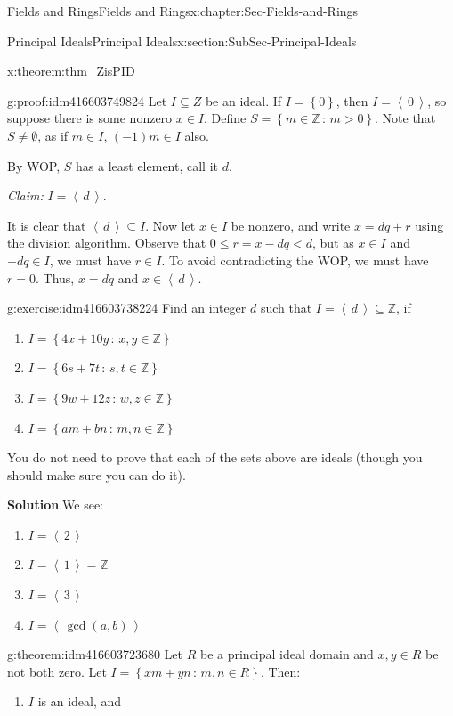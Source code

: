 \documentclass[oneside,10pt,]{book}
\numberwithin{equation}{section}
\renewcommand{\le}{\leqslant}
\newcommand{\ideal}[1]{\left\langle\, #1 \,\right\rangle}
\newcommand{\set}[1]{\left\{ {#1} \right\}}
\newcommand{\setof}[2]{{\left\{#1\,\colon\,#2\right\}}}
\def\Z{{\mathbb Z}}
\newcommand{\lt}{<}
\begin{document}
\begin{chapterptx}{Fields and Rings}{}{Fields and Rings}{}{}{x:chapter:Sec-Fields-and-Rings}
\begin{sectionptx}{Principal Ideals}{}{Principal Ideals}{}{}{x:section:SubSec-Principal-Ideals}
\begin{theorem}{}{}{x:theorem:thm_ZisPID}
\end{theorem}
\begin{proofptx}{}{g:proof:idm416603749824}
Let \(I\subseteq Z\) be an ideal. If \(I = \set{0}\), then \(I = \ideal{0}\), so suppose there is some nonzero \(x\in I\). Define \(S = \setof{m\in \Z}{m > 0}\). Note that \(S\ne \emptyset\), as if \(m\in I\), \((-1)m \in I\) also.%
\par
By WOP, \(S\) has a least element, call it \(d\).%
\par
\emph{Claim:} \(I = \ideal{d}\).%
\par
It is clear that \(\ideal{d}\subseteq I\). Now let \(x\in I\) be nonzero, and write \(x = dq + r\) using the division algorithm. Observe that \(0 \le r = x - dq \lt d\), but as \(x\in I\) and \(-dq \in I\), we must have \(r\in I\). To avoid contradicting the WOP, we must have \(r = 0\). Thus, \(x = dq\) and \(x\in \ideal{d}\).%
\end{proofptx}
\begin{inlineexercise}{}{g:exercise:idm416603738224}%
Find an integer \(d\) such that \(I = \ideal{d}\subseteq \Z\), if%
\begin{enumerate}
\item{}\(I = \setof{4x+10y}{x,y\in\Z}\)%
\item{}\(I = \setof{6s+7t}{s,t\in\Z}\)%
\item{}\(I = \setof{9w+12z}{w,z\in\Z}\)%
\item{}\(I = \setof{am+bn}{m,n\in\Z}\)%
\end{enumerate}
%
\par
You do not need to prove that each of the sets above are ideals (though you should make sure you can do it).%
\par\smallskip%
\noindent\textbf{Solution}.\hypertarget{g:solution:idm416603730176}{}\quad{}We see:%
\begin{enumerate}
\item{}\(I= \ideal{2}\)%
\item{}\(I = \ideal{1} = \Z\)%
\item{}\(I = \ideal{3}\)%
\item{}\(I = \ideal{\gcd(a,b)}\)%
\end{enumerate}
%
\end{inlineexercise}
\begin{theorem}{}{}{g:theorem:idm416603723680}%
Let \(R\) be a principal ideal domain and \(x,y\in R\) be not both zero. Let \(I = \setof{xm+yn}{m,n\in R}\). Then:%
\begin{enumerate}
\item{}\(I\) is an ideal, and%

\end{enumerate}
\end{theorem}
\end{sectionptx}
\end{chapterptx}
\end{document}
